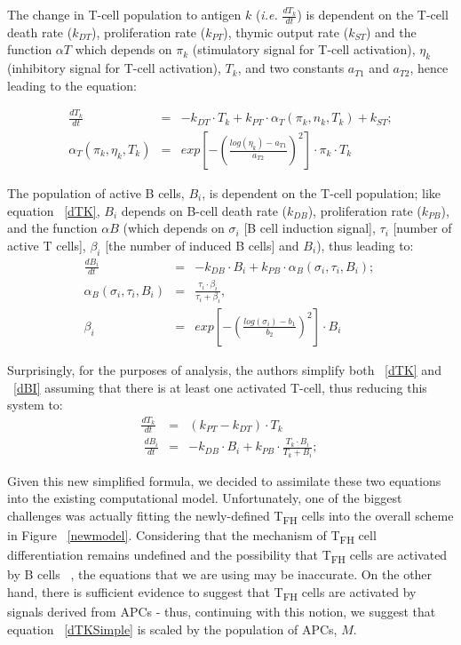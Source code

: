 \documentclass[a4paper, 12pt]{report}
\begin{document}
The change in T-cell population to antigen $k$ (\emph{i.e.} $\frac{dT_k}{dt}$) is dependent on the T-cell death rate ($k_{DT}$), proliferation rate ($k_{PT}$), thymic output rate ($k_{ST}$) and the function $\alpha{T}$ which depends on $\pi_{k}$ (stimulatory signal for T-cell activation), $\eta_{k}$ (inhibitory signal for T-cell activation), $T_{k}$, and two constants $a_{T1}$ and $a_{T2}$, hence leading to the equation:

\begin{eqnarray}
\frac{dT_k}{dt} &=& -k_{DT} \cdot T_k + k_{PT} \cdot \alpha_{T}(\pi_{k}, n_{k}, T_{k}) + k_{ST}; \label{dTK} \\
\alpha_{T}(\pi_{k}, \eta_{k}, T_{k}) &=& exp\left[-\left(\frac{log(\eta_{k}) - a_{T1}}{a_{T2}}\right)^{2}\right] \cdot \pi_{k} \cdot T_{k}
\end{eqnarray}

The population of active B cells, $B_{i}$, is dependent on the T-cell population; like equation ~\ref{dTK}, $B_{i}$ depends on B-cell death rate ($k_{DB}$), proliferation rate ($k_{PB}$), and the function $\alpha{B}$ (which depends on $\sigma_{i}$ [B cell induction signal], $\tau_{i}$ [number of active T cells], $\beta_{i}$ [the number of induced B cells] and $B_{i}$), thus leading to:
\begin{eqnarray}
\frac{dB_i}{dt} &=& -k_{DB} \cdot B_i + k_{PB} \cdot \alpha_{B}(\sigma_{i}, \tau_{i}, B_{i}); ~\label{dBI} \\
\alpha_{B}(\sigma_{i}, \tau_{i}, B_{i}) &=& \frac{\tau_{i}\cdot{\beta_{i}}}{\tau_{i} + \beta_{i}}, \\
\beta_{i} &=&  exp\left[-\left(\frac{log(\sigma_{i}) - b_{1}}{b_{2}}\right)^{2}\right] \cdot B_{i}
\end{eqnarray}

Surprisingly, for the purposes of analysis, the authors simplify both ~\ref{dTK} and ~\ref{dBI} assuming that there is at least one activated T-cell, thus reducing this system to:
\begin{eqnarray}
\frac{dT_k}{dt} &=& (k_{PT}-k_{DT}) \cdot T_k \\ ~\label{dTKSimple}
\frac{dB_i}{dt} &=& -k_{DB} \cdot B_i + k_{PB} \cdot \frac{T_{k} \cdot B_{i}}{T_{k}+B_{i}}; ~\label{dBISimple}
\end{eqnarray}

Given this new simplified formula, we decided to assimilate these two equations into the existing computational model. Unfortunately, one of the biggest challenges was actually fitting the newly-defined T\textsubscript{FH} cells into the overall scheme in Figure ~\ref{newmodel}. Considering that the mechanism of T\textsubscript{FH} cell differentiation remains undefined and the possibility that T\textsubscript{FH} cells are activated by B cells ~\cite{Crotty}, the equations that we are using may be inaccurate. On the other hand, there is sufficient evidence to suggest that T\textsubscript{FH} cells are activated by signals derived from APCs - thus, continuing with this notion, we suggest that equation ~\ref{dTKSimple} is scaled by the population of APCs, $M$.
\end{document}
